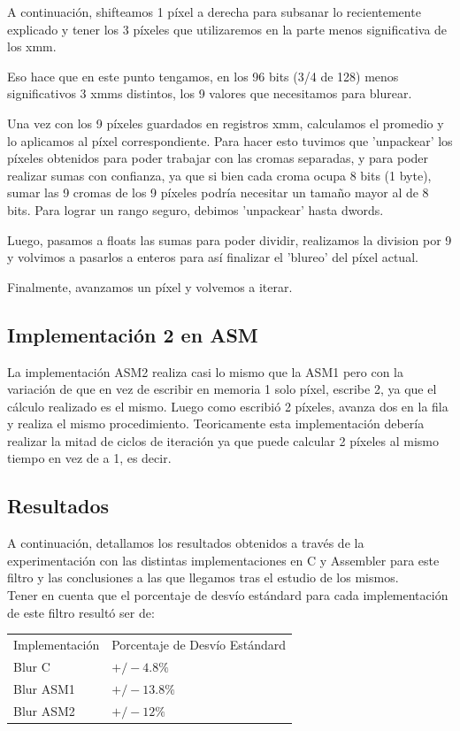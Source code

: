 A continuación, shifteamos 1 píxel a derecha para subsanar lo recientemente explicado y tener los 3 píxeles que utilizaremos en la parte menos significativa de los xmm.

Eso hace que en este punto tengamos, en los 96 bits (3/4 de 128) menos significativos 3 xmms distintos, los 9 valores que necesitamos para blurear.

Una vez con los 9 píxeles guardados en registros xmm, calculamos el promedio y lo aplicamos al píxel correspondiente. Para hacer esto tuvimos que 'unpackear' los píxeles obtenidos para poder trabajar con las cromas separadas, y para poder realizar sumas con confianza, ya que si bien cada croma ocupa 8 bits (1 byte), sumar las 9 cromas de los 9 píxeles podría necesitar un tamaño mayor al de 8 bits. Para lograr un rango seguro, debimos 'unpackear' hasta dwords.

Luego, pasamos a floats las sumas para poder dividir, realizamos la division por 9 y volvimos a pasarlos a enteros para así finalizar el 'blureo' del píxel actual.

Finalmente, avanzamos un píxel y volvemos a iterar.\\

\subsection{Implementación 2 en ASM}
La implementación ASM2 realiza casi lo mismo que la ASM1 pero con la variación de que en vez de escribir en memoria 1 solo píxel, escribe 2, ya que el cálculo realizado es el mismo. Luego como escribió 2 píxeles, avanza dos en la fila y realiza el mismo procedimiento. Teoricamente esta implementación debería realizar la mitad de ciclos de iteración ya que puede calcular 2 píxeles al mismo tiempo en vez de a 1, es decir.


\subsection{Resultados}
A continuación, detallamos los resultados obtenidos a través de la experimentación con las distintas implementaciones en C y Assembler para este filtro y las conclusiones a las que llegamos tras el estudio de los mismos.\\
Tener en cuenta que el porcentaje de desvío estándard para cada implementación de este filtro resultó ser de:
\begin{tabular}{| l | l |}
\hline
Implementación & Porcentaje de Desvío Estándard \\
Blur C  & $+/- 4.8\%$\\
Blur ASM1 &   $+/- 13.8\%$\\
Blur ASM2 & $+/- 12\%$\\
\hline
\end{tabular}


